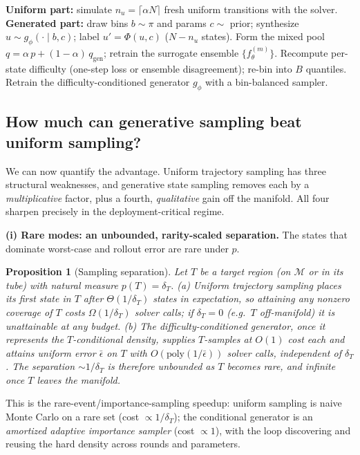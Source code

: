 \documentclass{article}
\theoremstyle{plain}
\newtheorem{proposition}{Proposition}
\theoremstyle{definition}
\theoremstyle{remark}
\newcommand{\state}{u}
\newcommand{\param}{c}
\newcommand{\manifold}{\mathcal{M}}
\newcommand{\sol}{\Phi}
\newcommand{\surr}{f_\theta}
\newcommand{\pnat}{p}
\newcommand{\qtr}{q}
\newcommand{\qgen}{q_{\mathrm{gen}}}
\newcommand{\unif}{\alpha}
\begin{document}
\begin{algorithm}[t]
\caption{One round of generative active learning (uniform fraction $\unif$, sampling law $\pi$, $B$ bins).}
\label{alg:loop}
\begin{algorithmic}[1]
\State \textbf{Uniform part:} simulate $n_u=\lceil\unif N\rceil$ fresh uniform transitions with the solver.
\State \textbf{Generated part:} draw bins $b\sim\pi$ and params $\param\sim$ prior; synthesize
       $\state\sim g_\phi(\cdot\mid b,\param)$; label $\state'=\sol(\state,\param)$ ($N-n_u$ states).
\State Form the mixed pool $\qtr=\unif\,\pnat+(1-\unif)\,\qgen$; retrain the surrogate ensemble $\{\surr^{(m)}\}$.
\State Recompute per-state difficulty (one-step loss or ensemble disagreement); re-bin into $B$ quantiles.
\State Retrain the difficulty-conditioned generator $g_\phi$ with a bin-balanced sampler.
\end{algorithmic}
\end{algorithm}

\subsection{How much can generative sampling beat uniform sampling?}\label{sec:method-advantage}
We can now quantify the advantage. Uniform trajectory sampling has three structural weaknesses, and
generative state sampling removes each by a \emph{multiplicative} factor, plus a fourth, \emph{qualitative}
gain off the manifold. All four sharpen precisely in the deployment-critical regime.

\textbf{(i) Rare modes: an unbounded, rarity-scaled separation.} The states that dominate worst-case and
rollout error are rare under $\pnat$.
\begin{proposition}[Sampling separation]\label{prop:separation}
Let $T$ be a target region (on $\manifold$ or in its tube) with natural measure $\pnat(T)=\delta_T$.
\emph{(a)} Uniform trajectory sampling places its first state in $T$ after $\Theta(1/\delta_T)$ states in
expectation, so attaining any nonzero coverage of $T$ costs $\Omega(1/\delta_T)$ solver calls; if
$\delta_T=0$ (e.g.\ $T$ off-manifold) it is unattainable at \emph{any} budget. \emph{(b)} The
difficulty-conditioned generator, once it represents the $T$-conditional density, supplies $T$-samples at
$O(1)$ cost each and attains uniform error $\bar\epsilon$ on $T$ with $O(\mathrm{poly}(1/\bar\epsilon))$
solver calls, \emph{independent of $\delta_T$}. The separation $\sim 1/\delta_T$ is therefore unbounded as
$T$ becomes rare, and infinite once $T$ leaves the manifold.
\end{proposition}
This is the rare-event/importance-sampling speedup: uniform sampling is naive Monte Carlo on a rare set
(cost $\propto1/\delta_T$); the conditional generator is an \emph{amortized adaptive importance sampler}
(cost $\propto1$), with the loop discovering and reusing the hard density across rounds and parameters.
\end{document}
